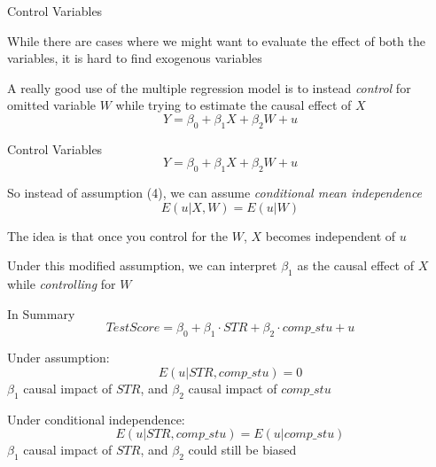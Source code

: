 \documentclass{./../div_teaching_slides}
\begin{document}
\begin{frame}{Control Variables}
\begin{witemize}
  \item While there are cases where we might want to evaluate the effect of both the variables, it is hard to find exogenous variables 
  \item A really good use of the multiple regression model is to instead \textit{control} for omitted variable $W$ while trying to estimate the causal effect of $X$
  $$ Y = \beta_0 + \beta_1 X + \beta_2 W + u  $$ 
\end{witemize}
\end{frame}

\begin{frame}{Control Variables}
  $$ Y = \beta_0 + \beta_1 X + \beta_2 W + u  $$ 
  \begin{witemize}
  \item So instead of assumption (4), we can assume \textit{conditional mean independence}  $$ E(u|X,W) = E(u|W) $$
  \item The idea is that once you control for the $W$, $X$ becomes independent of $u$
  \item Under this modified assumption, we can interpret $\beta_1$ as the causal effect of $X$ while \textit{controlling} for $W$ 
\end{witemize}
\end{frame}

\begin{frame}{In Summary}
\vspace{-1em}
$$ Test Score = \beta_0 + \beta_1 \cdot STR + \beta_2 \cdot comp\_stu + u $$ \vspace{-0.5em}
\begin{witemize}
  \item Under assumption: 
$$ E(u | STR,comp\_stu)=0   $$
$\beta_1$ causal impact of $STR$, and $\beta_2$ causal impact of $comp\_stu$
\item Under conditional independence: 
$$ E(u | STR, comp\_stu)= E(u |comp\_stu)   $$
$\beta_1$ causal impact of $STR$, and $\beta_2$ could still be biased
\end{witemize}
\end{frame}
\end{document}
